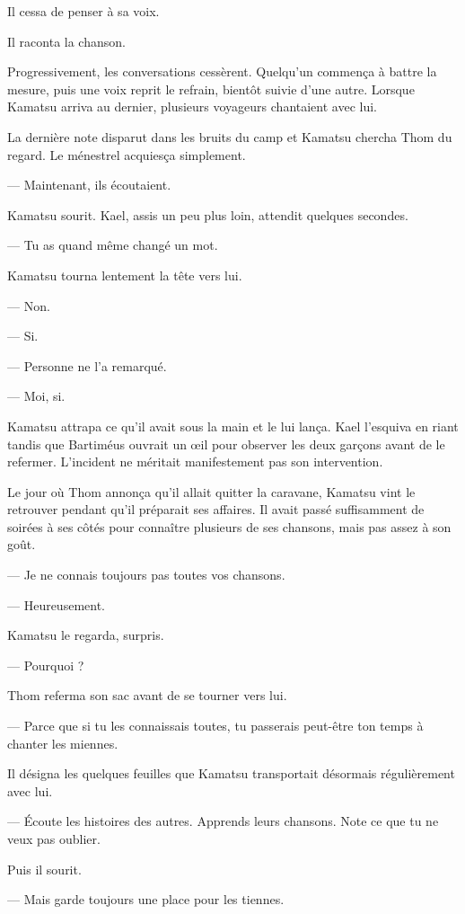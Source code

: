 Il cessa de penser à sa voix.

Il raconta la chanson.

Progressivement, les conversations cessèrent. Quelqu'un commença à battre la
mesure, puis une voix reprit le refrain, bientôt suivie d'une autre. Lorsque
Kamatsu arriva au dernier, plusieurs voyageurs chantaient avec lui.

La dernière note disparut dans les bruits du camp et Kamatsu chercha Thom du
regard. Le ménestrel acquiesça simplement.

— Maintenant, ils écoutaient.

Kamatsu sourit. Kael, assis un peu plus loin, attendit quelques secondes.

— Tu as quand même changé un mot.

Kamatsu tourna lentement la tête vers lui.

— Non.

— Si.

— Personne ne l'a remarqué.

— Moi, si.

Kamatsu attrapa ce qu'il avait sous la main et le lui lança. Kael l'esquiva en
riant tandis que Bartiméus ouvrait un œil pour observer les deux garçons avant
de le refermer. L'incident ne méritait manifestement pas son intervention.

\scenebreak

Le jour où Thom annonça qu'il allait quitter la caravane, Kamatsu vint le
retrouver pendant qu'il préparait ses affaires. Il avait passé suffisamment de
soirées à ses côtés pour connaître plusieurs de ses chansons, mais pas assez à
son goût.

— Je ne connais toujours pas toutes vos chansons.

— Heureusement.

Kamatsu le regarda, surpris.

— Pourquoi ?

Thom referma son sac avant de se tourner vers lui.

— Parce que si tu les connaissais toutes, tu passerais peut-être ton temps à
chanter les miennes.

Il désigna les quelques feuilles que Kamatsu transportait désormais
régulièrement avec lui.

— Écoute les histoires des autres. Apprends leurs chansons. Note ce que tu ne
veux pas oublier.

Puis il sourit.

— Mais garde toujours une place pour les tiennes.

